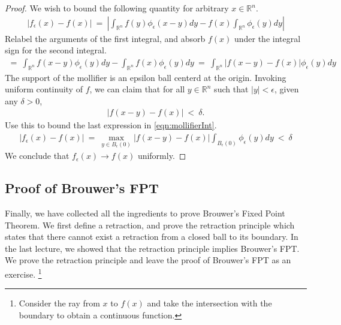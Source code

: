 \documentclass[10pt]{article}
\numberwithin{equation}{section}
\newcommand{\RR}{\mathbb{R}}
\numberwithin{theorem}{section}
\numberwithin{proposition}{section}
\numberwithin{lemma}{section}
\numberwithin{corollary}{section}
\numberwithin{remark}{section}
\numberwithin{definition}{section}
\numberwithin{example}{section}
\numberwithin{conjecture}{section}
\numberwithin{question}{section}
\begin{document}
    \begin{proof}
        We wish to bound the following quantity for arbitrary $x \in \RR^n$. 
        \begin{align}
            |f_\epsilon(x) - f(x)| \ = \ 
            \left|
            \int_{\RR^n} f(y) \phi_\epsilon(x - y) dy - f(x)\int_{\RR^n} \phi_\epsilon(y) dy
            \right|
        \end{align}
        Relabel the arguments of the first integral, and absorb $f(x)$ 
        under the integral sign for the second integral. 
        \begin{align} \label{eqn:mollifierInt}
            = \ \int_{\RR^n} f(x - y) \phi_\epsilon(y) dy - \int_{\RR^n} f(x) \phi_\epsilon(y) dy 
            \ = \ \int_{\RR^n} |f(x - y) - f(x)|\phi_\epsilon(y) dy
        \end{align}
        The support of the mollifier is an epsilon ball centerd at the origin. 
        Invoking uniform continuity of $f$, we can claim that for all $y\in \RR^n$ 
        such that $|y| < \epsilon$, given any $\delta > 0$,  
        \begin{align}
            |f(x - y) - f(x)| \ < \ \delta.
        \end{align}
        Use this to bound the last expression in \eqref{eqn:mollifierInt}. 
        \begin{align}
            |f_\epsilon(x) - f(x)| \ = \ 
        \max_{y \in B_\epsilon(0)} |f(x - y) - f(x)| 
        \int_{B_\epsilon(0)} \phi_\epsilon(y) dy \ < \  \delta
        \end{align}
        We conclude that $f_\epsilon(x) \rightarrow f(x)$ uniformly. 
    \end{proof}

    \subsection{Proof of Brouwer's FPT}

    Finally, we have collected all the ingredients to prove Brouwer's 
    Fixed Point Theorem. We first define a retraction, and prove the 
    retraction principle which states that there cannot exist a 
    retraction from a closed ball to its boundary. In the last lecture, 
    we showed that the retraction principle implies Brouwer's FPT. 
    We prove the retraction principle and leave the proof of Brouwer's FPT as 
    an exercise. \footnote{Consider the ray from $x$ to $f(x)$ and 
    take the intersection with the boundary to obtain a continuous function. }
    
\end{document}
